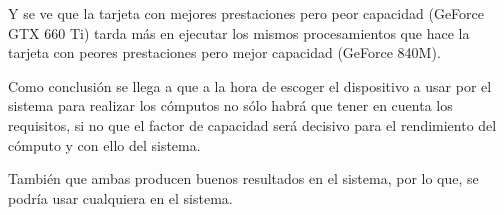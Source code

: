 \bigskip
Y se ve que la tarjeta con mejores prestaciones pero peor capacidad (GeForce GTX 660 Ti) tarda más en ejecutar los mismos procesamientos que hace la tarjeta con peores prestaciones pero mejor capacidad (GeForce 840M).

\bigskip
Como conclusión se llega a que a la hora de escoger el dispositivo a usar por el sistema para realizar los cómputos no sólo habrá que tener en cuenta los requisitos, si no que el factor de capacidad será decisivo para el rendimiento del cómputo y con ello del sistema.

También que ambas producen buenos resultados en el sistema, por lo que, se podría usar cualquiera en el sistema.

